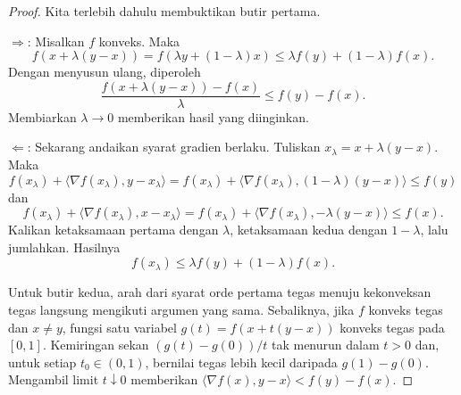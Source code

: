 \begin{proof}
    Kita terlebih dahulu membuktikan butir pertama.

    $\Rightarrow$: Misalkan $f$ konveks. Maka
    \begin{equation}
        f(x+\lambda(y-x))=f(\lambda y+(1-\lambda)x)\leq\lambda f(y)+(1-\lambda)f(x).
    \end{equation}
    Dengan menyusun ulang, diperoleh
    \begin{equation}
        \frac{f(x+\lambda(y-x))-f(x)}{\lambda}\leq f(y)-f(x).
    \end{equation}
    Membiarkan $\lambda\rightarrow0$ memberikan hasil yang diinginkan.

    $\Leftarrow$: Sekarang andaikan syarat gradien berlaku. Tuliskan $x_\lambda=x+\lambda(y-x)$. Maka
    \begin{equation*}
        f(x_\lambda)+\langle\nabla f(x_\lambda),y-x_\lambda\rangle
        =f(x_\lambda)+\langle\nabla f(x_\lambda),(1-\lambda)(y-x)\rangle\leq f(y)
    \end{equation*}
    dan
    \begin{equation*}
        f(x_\lambda)+\langle\nabla f(x_\lambda),x-x_\lambda\rangle
        =f(x_\lambda)+\langle\nabla f(x_\lambda),-\lambda(y-x)\rangle\leq f(x).
    \end{equation*}
    Kalikan ketaksamaan pertama dengan $\lambda$, ketaksamaan kedua dengan $1-\lambda$, lalu jumlahkan. Hasilnya
    \begin{equation*}
        f(x_\lambda)\leq\lambda f(y)+(1-\lambda)f(x).
    \end{equation*}

    Untuk butir kedua, arah dari syarat orde pertama tegas menuju kekonveksan
    tegas langsung mengikuti argumen yang sama. Sebaliknya, jika $f$ konveks
    tegas dan $x\neq y$, fungsi satu variabel
    $g(t)=f(x+t(y-x))$ konveks tegas pada $[0,1]$. Kemiringan sekan
    $(g(t)-g(0))/t$ tak menurun dalam $t>0$ dan, untuk setiap $t_0\in(0,1)$,
    bernilai tegas lebih kecil daripada $g(1)-g(0)$. Mengambil limit
    $t\downarrow0$ memberikan
    $\langle\nabla f(x),y-x\rangle< f(y)-f(x)$.
\end{proof}

